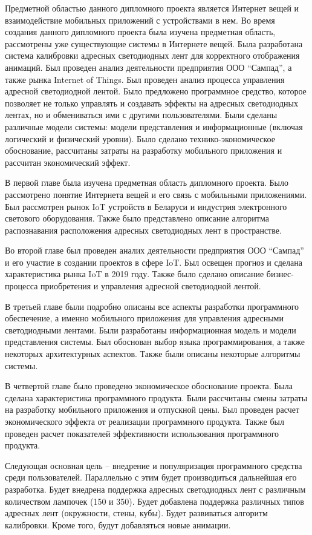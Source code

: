 Предметной областью данного дипломного проекта является Интернет вещей и взаимодействие мобильных приложений с устройствами в нем. Во время создания данного дипломного проекта была изучена предметная область, рассмотрены уже существующие системы в Интернете вещей. Была разработана система калибровки адресных светодиодных лент для корректного отображения анимаций. Был проведен анализ деятельности предприятия ООО \enquote{Сампад}, а также рынка Internet of Things. Был проведен анализ процесса управления адресной светодиодной лентой. Было предложено программное средство, которое позволяет не только управлять и создавать эффекты на адресных светодиодных лентах, но и обмениваться ими с другими пользователями. Были сделаны различные модели системы: модели представления и информационные (включая логический и физический уровни). Было сделано технико-экономическое обоснование, рассчитаны затраты на разработку мобильного приложения и рассчитан экономический эффект.

В первой главе была изучена предметная область дипломного проекта. Было рассмотрено понятие Интернета вещей и его связь с мобильными приложениями. Был рассмотрен рынок IoT устройств в Беларуси и индустрия электронного светового оборудования. Также было представлено описание алгоритма распознавания расположения адресных светодиодных лент в пространстве.

Во второй главе был проведен аналих деятельности предприятия ООО \enquote{Сампад} и его участие в создании проектов в сфере IoT. Был освещен прогноз и сделана характеристика рынка IoT в 2019 году. Также было сделано описание бизнес-процесса приобретения и управления адресной светодиодной лентой.

В третьей главе были подробно описаны все аспекты разработки программного обеспечение, а именно мобильного приложения для управления адресными светодиодными лентами. Были разработаны информационная модель и модели представления системы. Был обоснован выбор языка программирования, а также некоторых архитектурных аспектов. Также были описаны некоторые алгоритмы системы.

В четвертой главе было проведено экономическое обоснование проекта. Была сделана характеристика программного продукта. Были рассчитаны смены затраты на разработку мобильного приложения и отпускной цены. Был проведен расчет экономического эффекта от реализации программного продукта. Также был проведен расчет показателей эффективности использования программного продукта.

Следующая основная цель -- внедрение и популяризация программного средства среди пользователей. Параллельно с этим будет производиться дальнейшая его разработка. Будет внедрена поддержка адресных светодиодных лент с различным количеством лампочек (150 и 350). Будет добавлена поддержка различных типов адресных лент (окружности, стены, кубы). Будет развиваться алгоритм калибровки. Кроме того, будут добавляться новые анимации.
